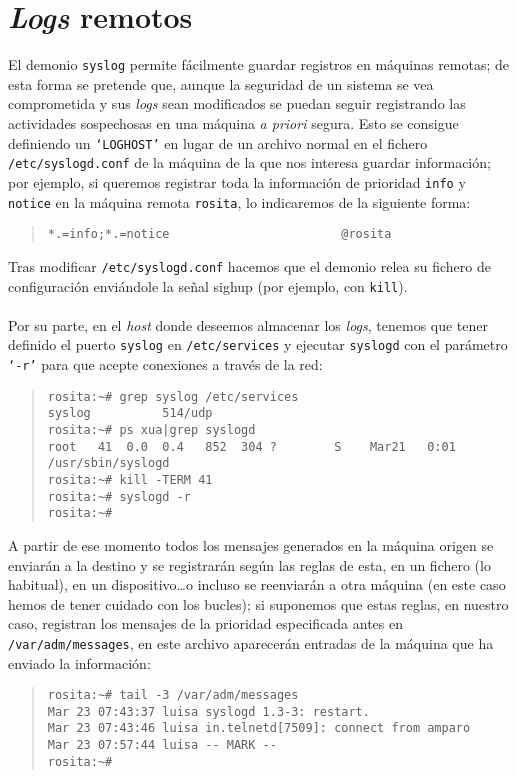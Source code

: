 \section{{\it Logs} remotos}
El demonio {\tt syslog} permite f\'acilmente guardar registros en m\'aquinas
remotas; de esta forma se pretende que, aunque la seguridad de un sistema se
vea comprometida y sus {\it logs} sean modificados se puedan seguir registrando
las actividades sospechosas en una m\'aquina {\it a priori} segura. Esto se
consigue definiendo un {\tt `LOGHOST'} en lugar de un archivo normal en el 
fichero {\tt /etc/syslogd.conf} de la m\'aquina de la que nos interesa guardar 
informaci\'on; por ejemplo, si queremos registrar toda la informaci\'on de
prioridad {\tt info} y {\tt notice} en la m\'aquina remota {\tt rosita}, lo
indicaremos de la siguiente forma:
\begin{quote}
\begin{verbatim}
*.=info;*.=notice                        @rosita
\end{verbatim}
\end{quote}
Tras modificar {\tt /etc/syslogd.conf} hacemos que el demonio relea su fichero
de configuraci\'on envi\'andole la se\~nal {\sc sighup} (por ejemplo, con 
{\tt kill}).\\
\\Por su parte, en el {\it host} donde deseemos almacenar los {\it logs}, 
tenemos
que tener definido el puerto {\tt syslog} en {\tt /etc/services} y ejecutar
{\tt syslogd} con el par\'ametro {\tt `-r'} para que acepte conexiones a 
trav\'es de la red:
\begin{quote}
\begin{verbatim}
rosita:~# grep syslog /etc/services 
syslog          514/udp
rosita:~# ps xua|grep syslogd
root   41  0.0  0.4   852  304 ?        S    Mar21   0:01 /usr/sbin/syslogd
rosita:~# kill -TERM 41
rosita:~# syslogd -r 
rosita:~#
\end{verbatim}
\end{quote}
A partir de ese momento todos los mensajes generados en la m\'aquina origen
se enviar\'an a la destino y se registrar\'an seg\'un las reglas de esta,
en un fichero (lo habitual), en un dispositivo\ldots o incluso se reenviar\'an
a otra m\'aquina (en este caso hemos de tener cuidado con los bucles); si
suponemos que estas reglas, en nuestro caso, registran los mensajes de la
prioridad especificada antes en {\tt /var/adm/messages}, en este archivo
aparecer\'an entradas de la m\'aquina que ha enviado la informaci\'on:
\begin{quote}
\begin{verbatim}
rosita:~# tail -3 /var/adm/messages
Mar 23 07:43:37 luisa syslogd 1.3-3: restart. 
Mar 23 07:43:46 luisa in.telnetd[7509]: connect from amparo
Mar 23 07:57:44 luisa -- MARK -- 
rosita:~# 
\end{verbatim}
\end{quote}

